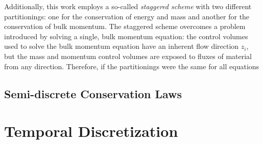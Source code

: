 \documentclass[12pt]{../UWMadThesis}
\begin{document}
Additionally, this work employs a so-called \textit{staggered scheme} with two different partitionings: one for the conservation of energy and mass and another for the conservation of bulk momentum.
The staggered scheme overcomes a problem introduced by solving a single, bulk momentum equation: the control volumes used to solve the bulk momentum equation have an inherent flow direction $z_i$, but the mass and momentum control volumes are exposed to fluxes of material from any direction.
Therefore, if the partitionings were the same for all equations





\subsection{Semi-discrete Conservation Laws}



\section{Temporal Discretization}
\end{document}
